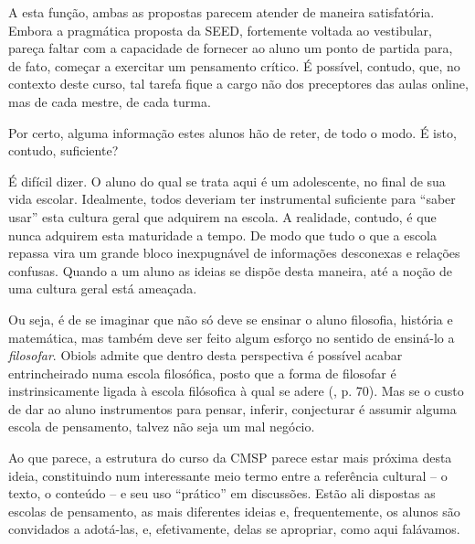 \documentclass[12pt,a4paper]{article}
\begin{document}
	A esta função, ambas as propostas parecem atender de maneira 
	satisfatória. Embora a pragmática proposta da SEED, fortemente 
	voltada ao vestibular, pareça faltar com a capacidade de 
	fornecer ao aluno um ponto de partida para, de fato, começar a 
	exercitar um pensamento crítico. É possível, contudo, que, no 
	contexto deste curso, tal tarefa fique a cargo não dos preceptores 
	das aulas online, mas de cada mestre, de cada turma. 

	Por certo, alguma informação estes alunos hão de reter, de todo o 
	modo. É isto, contudo, suficiente? 
	
	É difícil dizer. O aluno do qual se trata aqui é um adolescente, no final 
	de sua vida escolar. Idealmente, todos deveriam ter instrumental 
	suficiente para ``saber usar'' esta cultura geral que adquirem na escola. 
	A realidade, contudo, é que nunca adquirem esta maturidade a tempo. De 
	modo que tudo o que a escola repassa vira um grande bloco inexpugnável de 
	informações desconexas e relações confusas. Quando a um aluno as ideias 
	se dispõe desta maneira, até a noção de uma cultura geral está ameaçada. 
	
	Ou seja, é de se imaginar que não só deve se ensinar o aluno filosofia, 
	história e matemática, mas também deve ser feito algum esforço no sentido 
	de ensiná-lo a \textit{filosofar}. Obiols admite que dentro desta 
	perspectiva é possível acabar entrincheirado numa escola filosófica, posto 
	que a forma de filosofar é instrinsicamente ligada à escola filósofica à 
	qual se adere (\cite{obiols}, p. 70). Mas se o custo de dar ao aluno 
	instrumentos para pensar, inferir, conjecturar é assumir alguma escola 
	de pensamento, talvez não seja um mal negócio. 
	
	Ao que parece, a estrutura do curso da CMSP parece estar mais 
	próxima desta ideia, constituindo num interessante meio termo 
	entre a referência cultural -- o texto, o conteúdo -- e seu uso 
	“prático” em discussões. Estão ali dispostas as escolas de 
	pensamento, as mais diferentes ideias e, frequentemente, os 
	alunos são convidados a adotá-las, e, efetivamente, delas 
	se apropriar, como aqui falávamos. 

\end{document}
